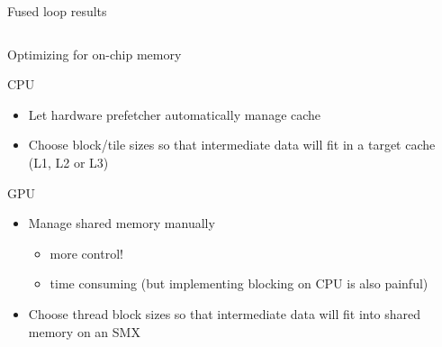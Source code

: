 \begin{frame}[fragile]{Fused loop results}
\begin{columns}[T]
\begin{column}{0.5\textwidth}
        \end{column}
    \end{columns}



\end{frame}

\begin{frame}[fragile]{Optimizing for on-chip memory}
    \begin{info}{CPU}
        \begin{itemize}
            \item Let hardware prefetcher automatically manage cache
            \item Choose block/tile sizes so that intermediate data will fit in a target cache (L1, L2 or L3)
        \end{itemize}
    \end{info}
    \begin{info}{GPU}
        \begin{itemize}
            \item Manage shared memory manually
            \begin{itemize}
                \item more control!
                \item time consuming (but implementing blocking on CPU is also painful)
            \end{itemize}
            \item Choose thread block sizes so that intermediate data will fit into shared memory on an SMX
        \end{itemize}
    \end{info}

\end{frame}

